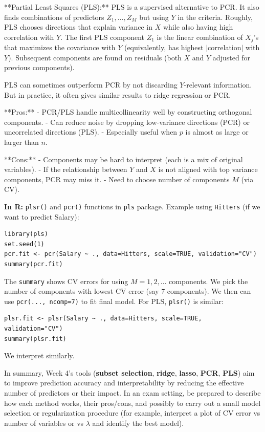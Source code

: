 \documentclass[11pt]{article}
\begin{document}
**Partial Least Squares (PLS):** PLS is a supervised alternative to PCR. It also finds combinations of predictors $Z_1,\ldots,Z_M$ but using $Y$ in the criteria. Roughly, PLS chooses directions that explain variance in $X$ while also having high correlation with $Y$. The first PLS component $Z_1$ is the linear combination of $X_j$'s that maximizes the covariance with $Y$ (equivalently, has highest $|$correlation$|$ with $Y$). Subsequent components are found on residuals (both $X$ and $Y$ adjusted for previous components).

PLS can sometimes outperform PCR by not discarding $Y$-relevant information. But in practice, it often gives similar results to ridge regression or PCR. 

**Pros:** 
- PCR/PLS handle multicollinearity well by constructing orthogonal components.
- Can reduce noise by dropping low-variance directions (PCR) or uncorrelated directions (PLS).
- Especially useful when $p$ is almost as large or larger than $n$.

**Cons:** 
- Components may be hard to interpret (each is a mix of original variables).
- If the relationship between $Y$ and $X$ is not aligned with top variance components, PCR may miss it.
- Need to choose number of components $M$ (via CV).

\textbf{In R:} \texttt{plsr()} and \texttt{pcr()} functions in \texttt{pls} package.
Example using \texttt{Hitters} (if we want to predict Salary):
\begin{verbatim}
library(pls)
set.seed(1)
pcr.fit <- pcr(Salary ~ ., data=Hitters, scale=TRUE, validation="CV")
summary(pcr.fit)
\end{verbatim}
The \texttt{summary} shows CV errors for using $M=1,2,\dots$ components. We pick the number of components with lowest CV error (say 7 components). We then can use \texttt{pcr(..., ncomp=7)} to fit final model. For PLS, \texttt{plsr()} is similar:
\begin{verbatim}
plsr.fit <- plsr(Salary ~ ., data=Hitters, scale=TRUE, validation="CV")
summary(plsr.fit)
\end{verbatim}
We interpret similarly. 

In summary, Week 4's tools (\textbf{subset selection}, \textbf{ridge}, \textbf{lasso}, \textbf{PCR}, \textbf{PLS}) aim to improve prediction accuracy and interpretability by reducing the effective number of predictors or their impact. In an exam setting, be prepared to describe how each method works, their pros/cons, and possibly to carry out a small model selection or regularization procedure (for example, interpret a plot of CV error vs number of variables or vs $\lambda$ and identify the best model).
\end{document}
